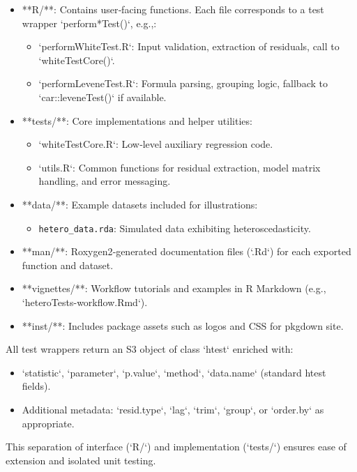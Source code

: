 \begin{itemize}
  \item **R/**: Contains user‐facing functions. Each file corresponds to a test wrapper `perform*Test()`, e.g.,:
    \begin{itemize}
      \item `performWhiteTest.R`: Input validation, extraction of residuals, call to `whiteTestCore()`.
      \item `performLeveneTest.R`: Formula parsing, grouping logic, fallback to `car::leveneTest()` if available.
    \end{itemize}
  \item **tests/**: Core implementations and helper utilities:
    \begin{itemize}
      \item `whiteTestCore.R`: Low‐level auxiliary regression code.
      \item `utils.R`: Common functions for residual extraction, model matrix handling, and error messaging.
    \end{itemize}
  \item **data/**: Example datasets included for illustrations:
    \begin{itemize}
      \item \texttt{hetero\_data.rda}: Simulated data exhibiting heteroscedasticity.
    \end{itemize}
  \item **man/**: Roxygen2‐generated documentation files (`.Rd`) for each exported function and dataset.
  \item **vignettes/**: Workflow tutorials and examples in R Markdown (e.g., `heteroTests-workflow.Rmd`).
  \item **inst/**: Includes package assets such as logos and CSS for pkgdown site.
\end{itemize}

All test wrappers return an S3 object of class `htest` enriched with:
\begin{itemize}
  \item `statistic`, `parameter`, `p.value`, `method`, `data.name` (standard htest fields).
  \item Additional metadata: `resid.type`, `lag`, `trim`, `group`, or `order.by` as appropriate.
\end{itemize}

This separation of interface (`R/`) and implementation (`tests/`) ensures ease of extension and isolated unit testing.


